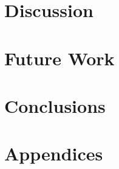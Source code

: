 \documentclass[12pt]{report}
\begin{document}
\chapter{Discussion}


\chapter{Future Work}


\chapter{Conclusions}








\chapter{Appendices}

\end{document}

